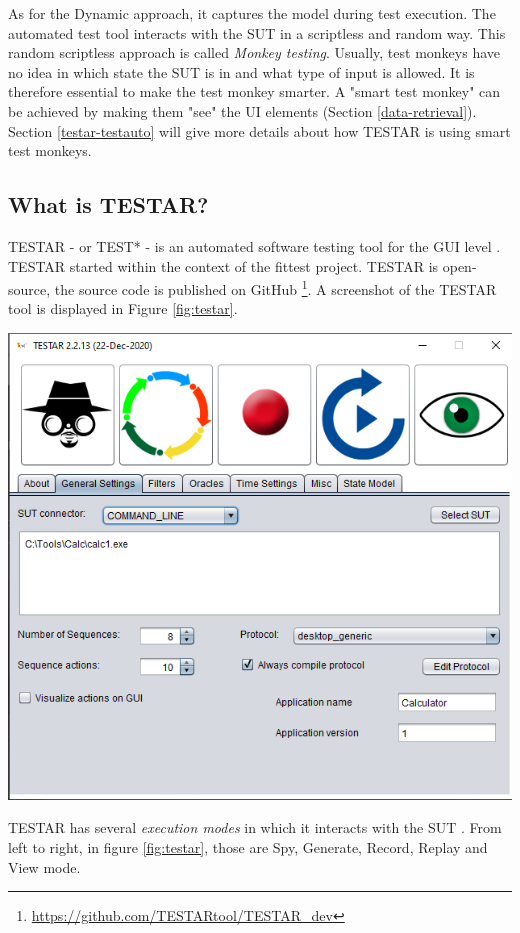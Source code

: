     As for the Dynamic approach, it captures the model during test execution. The automated test tool interacts with the SUT in a scriptless and random way. This random scriptless approach is called \emph{Monkey testing}. Usually, test monkeys have no idea in which state the SUT is in and what type of input is allowed. It is therefore essential to make the test monkey smarter. A "smart test monkey" can be achieved by making them "see" the UI elements (Section \ref{data-retrieval}). Section \ref{testar-testauto} will give more details about how TESTAR is using smart test monkeys.

\subsection{What is TESTAR?} \label{what-is-testar}
TESTAR - or TEST* - is an automated software testing tool for the GUI level \cite{testar-about}. TESTAR started within the context of the \acrfull{fittest} project. TESTAR is open-source, the source code is published on GitHub \footnote{ \url{https://github.com/TESTARtool/TESTAR\_dev}}. A screenshot of the TESTAR tool is displayed in Figure \ref{fig:testar}.

\begingroup
\captionsetup{type=figure}
\includegraphics[scale=0.5]{pics/testar.png}
\label{fig:testar}
\endgroup

TESTAR has several \emph{execution modes} in which it interacts with the SUT \cite{testar-manual}. From left to right, in figure \ref{fig:testar}, those are Spy, Generate, Record, Replay and View mode. 

